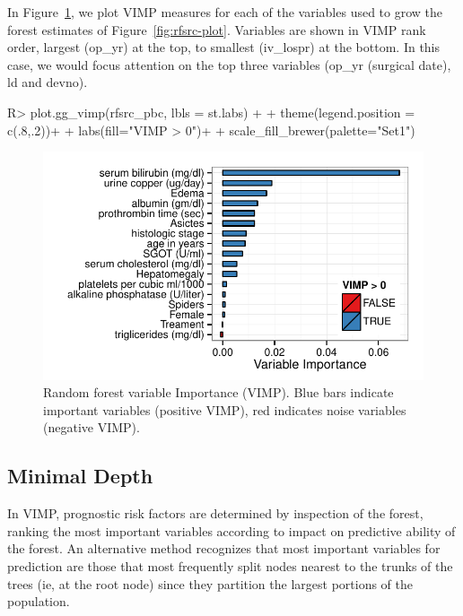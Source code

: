 \documentclass[nojss]{jss}
\begin{document}
In Figure~\ref{fig:rf-vimp}, we plot VIMP measures for each of the variables used to grow the forest estimates of Figure~\ref{fig:rfsrc-plot}. Variables are shown in VIMP rank order, largest (op\_yr) at the top, to smallest (iv\_lospr) at the bottom. In this case, we would focus attention on the top three variables (op\_yr (surgical date), ld and devno).
\begin{Schunk}
\begin{Sinput}
R> plot.gg_vimp(rfsrc_pbc, lbls = st.labs) + 
+   theme(legend.position = c(.8,.2))+
+   labs(fill="VIMP > 0")+
+   scale_fill_brewer(palette="Set1")
\end{Sinput}
\begin{figure}[!htpb]

{\centering \includegraphics[width=\maxwidth]{figure/rfs-rf-vimp-1} 

}

\caption[Random forest variable Importance (VIMP)]{Random forest variable Importance (VIMP). Blue bars indicate important variables (positive VIMP), red indicates noise variables (negative VIMP).\label{fig:rf-vimp}}
\end{figure}
\end{Schunk}

\subsection{Minimal Depth}\label{S:minimalDepth}
In VIMP, prognostic risk factors are determined by inspection of the forest, ranking the most important variables according to impact on predictive ability of the forest. An alternative method recognizes that most important variables for prediction are those that most frequently split nodes nearest to the trunks of the trees (ie, at the root node) since they partition the largest portions of the population. 
\end{document}
